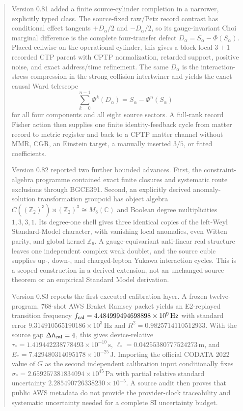 \documentclass[11pt]{article}
\theoremstyle{definition}
\theoremstyle{remark}
\begin{document}
\begin{abstract}
Version 0.81 added a finite source-cylinder completion in a narrower, explicitly typed class. The source-fixed raw/Petz record contrast has conditional effect tangents $+D_\alpha/2$ and $-D_\alpha/2$, so its gauge-invariant Choi marginal difference is the complete four-transfer defect $D_\alpha=S_\alpha-\Phi(S_\alpha)$. Placed cellwise on the operational cylinder, this gives a block-local $3+1$ recorded CTP parent with CPTP normalization, retarded support, positive noise, and exact address/time refinement. The same $D_\alpha$ is the interaction-stress compression in the strong collision intertwiner and yields the exact causal Ward telescope
\[
\sum_{k=0}^{n-1}\Phi^k(D_\alpha)=S_\alpha-\Phi^n(S_\alpha)
\]
for all four components and all eight source sectors. A full-rank record Fisher action then supplies one finite identity-feedback cycle from matter record to metric register and back to a CPTP matter channel without MMR, CGR, an Einstein target, a manually inserted $3/5$, or fitted coefficients.

Version 0.82 reported two further bounded advances. First, the constraint-algebra programme contained exact finite closures and systematic route exclusions through BGCE391. Second, an explicitly derived anomaly-solution transformation groupoid has object algebra $C((\mathbb Z_2)^3)\rtimes(\mathbb Z_2)^3\cong M_8(\mathbb C)$ and Boolean degree multiplicities $1,3,3,1$. Its degree-one shell gives three identical copies of the left-Weyl Standard-Model character, with vanishing local anomalies, even Witten parity, and global kernel $\mathbb Z_6$. A gauge-equivariant anti-linear real structure leaves one independent complex weak doublet, and the source cubic supplies up-, down-, and charged-lepton Yukawa interaction cycles. This is a scoped construction in a derived extension, not an unchanged-source theorem or an empirical Standard Model derivation.

Version 0.83 reports the first executed calibration layer. A frozen twelve-program, 768-shot AWS Braket Ramsey packet yields an E2-replayed transition frequency $f_{\rm cal}=4.484999494698898\times10^9\,\mathrm{Hz}$ with standard error $9.314910565190186\times10^3\,\mathrm{Hz}$ and $R^2=0.9825714110512933$. With the source gap $\Delta h_{\rm cal}=4$, this gives device-relative $\tau_*=1.419442238778493\times10^{-10}\,\mathrm{s}$, $\ell_*=0.04255380777524273\,\mathrm{m}$, and $E_*=7.429480314095178\times10^{-25}\,\mathrm{J}$. Importing the official CODATA 2022 value of $G$ as the second independent calibration input conditionally fixes $\sigma_*=2.659257381834094\times10^{45}\,\mathrm{Pa}$ with partial relative standard uncertainty $2.285490726338230\times10^{-5}$. A source audit then proves that public AWS metadata do not provide the provider-clock traceability and systematic uncertainty needed for a complete SI uncertainty budget.


\end{abstract}
\end{document}
